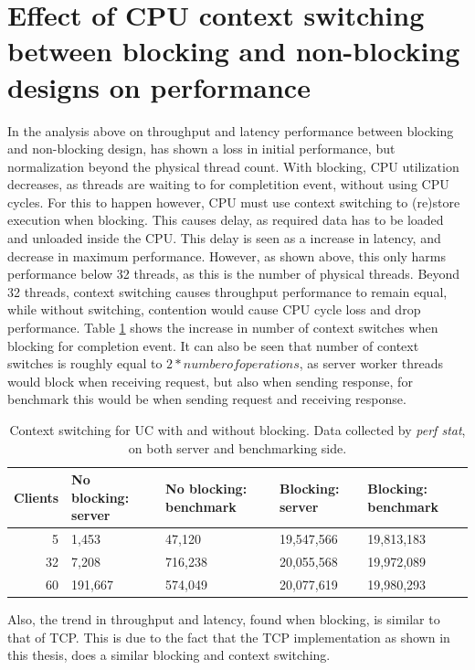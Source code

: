 \section{Effect of CPU context switching between blocking and non-blocking designs on performance}
In the analysis above on throughput and latency performance between blocking and non-blocking design, has shown a loss in initial performance, but normalization beyond the physical thread count.
With blocking, CPU utilization decreases, as threads are waiting to for completition event, without using CPU cycles.
For this to happen however, CPU must use context switching to (re)store execution when blocking.
This causes delay, as required data has to be loaded and unloaded inside the CPU.
This delay is seen as a increase in latency, and decrease in maximum performance.
However, as shown above, this only harms performance below 32 threads, as this is the number of physical threads.
Beyond 32 threads, context switching causes throughput performance to remain equal, while without switching, contention would cause CPU cycle loss and drop performance.
Table \ref{tab:context} shows the increase in number of context switches when blocking for completion event.
It can also be seen that number of context switches is roughly equal to $2*number of operations$, as server worker threads would block when receiving request, but also when sending response, for benchmark this would be when sending request and receiving response.
\begin{table}
    \centering
    \begin{tabular}{r p{3cm} p{3cm} p{3cm} p{3cm}}
        \toprule
        \textbf{Clients} & \textbf{No blocking: server} & \textbf{No blocking: benchmark} & \textbf{Blocking: server} & \textbf{Blocking: benchmark} \\
        \midrule
        5 & 1,453 & 47,120 & 19,547,566 & 19,813,183 \\
        32 & 7,208 & 716,238 & 20,055,568 & 19,972,089 \\
        60 & 191,667 & 574,049 & 20,077,619 & 19,980,293 \\
        \bottomrule
    \end{tabular}
    \caption[Context switching for UC with and without blocking.]{Context switching for UC with and without blocking. Data collected by \textit{perf stat}, on both server and benchmarking side.}
    \label{tab:context}
\end{table}


Also, the trend in throughput and latency, found when blocking, is similar to that of TCP.
This is due to the fact that the TCP implementation as shown in this thesis, does a similar blocking and context switching.


